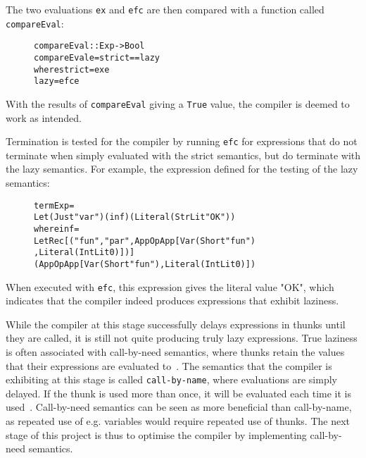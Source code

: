 \noindent The two evaluations \texttt{ex} and \texttt{efc} are then compared
with a function called \texttt{compareEval}:

\begin{figure}[H]
\begin{alltt}
  compareEval :: Exp -> Bool
  compareEval e = strict == lazy
    where strict = ex e
          lazy   = efc e
\end{alltt}
\end{figure}

\noindent
With the results of \texttt{compareEval} giving a \texttt{True} value,
the compiler is deemed to work as intended.

Termination is tested for the compiler by running \texttt{efc} for expressions
that do not terminate when simply evaluated with the strict semantics, but do
terminate with the lazy semantics. For example, the expression defined for the
testing of the lazy semantics:

\begin{figure}[H]
\begin{alltt}
  termExp =
    Let (Just "var") (inf) (Literal (StrLit "OK"))
    where inf =
      LetRec [("fun", "par", App OpApp [Var (Short "fun")
                                       ,Literal (IntLit 0)])]
      (App OpApp [Var (Short "fun"), Literal (IntLit 0)])
\end{alltt}
\end{figure}

\noindent When executed with \texttt{efc}, this expression gives the literal
value "OK", which indicates that the compiler indeed produces expressions that
exhibit laziness.

While the compiler at this stage successfully delays expressions in thunks
until they are called, it is still not quite producing truly lazy expressions.
True laziness is often associated with call-by-need semantics, where thunks
retain the values that their expressions are evaluated to~\cite{pltbook}.
The semantics that
the compiler is exhibiting at this stage is called \texttt{call-by-name}, where
evaluations are simply delayed. If the thunk is used more than once, it will
be evaluated each time it is used~\cite{DragonBook}.
Call-by-need semantics can be seen as more beneficial than call-by-name, as
repeated use of e.g. variables would require repeated use of thunks.
The next stage of this project is thus to optimise the compiler by implementing
call-by-need semantics.
